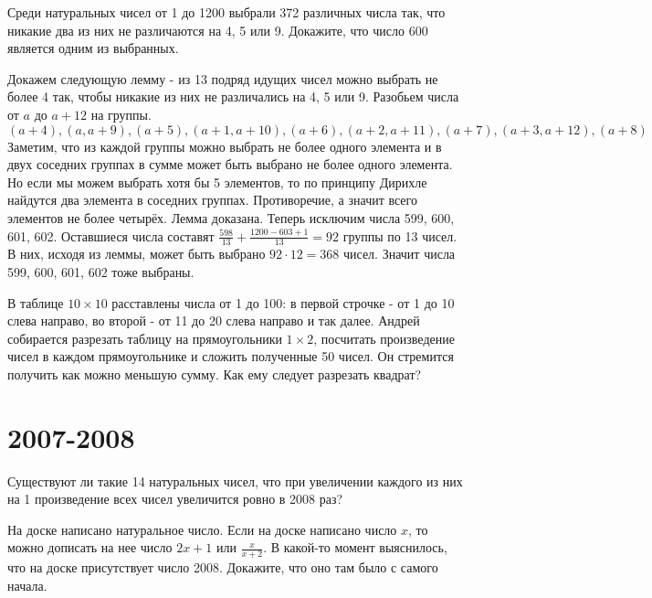 \documentclass[11pt, a4paper]{problems_template}
\begin{document}
\begin{exercise}
Среди натуральных чисел от 1 до 1200 выбрали 372 различных числа так, что никакие два из них не различаются на 4, 5 или 9. Докажите, что число 600 является одним из выбранных.
\end{exercise}

\begin{Solution}
Докажем следующую лемму - из 13 подряд идущих чисел можно выбрать не более 4 так, чтобы никакие из них не различались на 4, 5 или 9. Разобьем числа от $a$ до $a + 12$ на группы.
$$
(a + 4), (a, a + 9), (a + 5), (a + 1, a + 10), (a + 6), (a + 2, a + 11), (a + 7), (a + 3, a + 12), (a + 8) 
$$
Заметим, что из каждой группы можно выбрать не более одного элемента и в двух соседних группах в сумме может быть выбрано не более одного элемента. Но если мы можем выбрать хотя бы 5 элементов, то по принципу Дирихле найдутся два элемента в соседних группах. Противоречие, а значит всего элементов не более четырёх. Лемма доказана. Теперь исключим числа 599, 600, 601, 602. Оставшиеся числа составят $\frac{598}{13} + \frac{1200 - 603 + 1}{13} = 92$ группы по 13 чисел.  В них, исходя из леммы, может быть выбрано $92 \cdot 12 = 368$ чисел. Значит числа 599, 600, 601, 602 тоже выбраны. 
\end{Solution}

\begin{exercise}
В таблице $10 \times 10$ расставлены числа от 1 до 100: в первой строчке - от 1 до 10 слева направо, во второй - от 11 до 20 слева направо
и так далее. Андрей собирается разрезать таблицу на прямоугольники $1 \times 2$, посчитать произведение чисел в каждом прямоугольнике и сложить полученные 50 чисел. Он стремится получить как можно меньшую сумму. Как ему следует разрезать квадрат?
\end{exercise}

\chapter{2007-2008}

\begin{exercise}
Существуют ли такие 14 натуральных чисел, что при увеличении каждого из них на 1 произведение всех чисел увеличится ровно в 2008 раз?
\end{exercise}

\begin{exercise}
На доске написано натуральное число. Если на доске написано число $x$, то можно дописать на нее число $2x + 1$ или $\frac{x}{x + 2}$. В какой-то момент выяснилось, что на доске присутствует число 2008. Докажите, что оно там было с самого начала.
\end{exercise}
\end{document}
